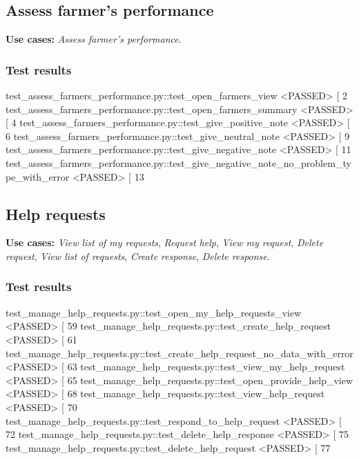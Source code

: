 \subsection{Assess farmer's performance}

\textbf{Use cases:} \textit{Assess farmer's performance}.

\subsubsection*{Test results}
\begin{verbnobox}[\scriptsize \vbdelim]
test_assess_farmers_performance.py::test_open_farmers_view <PASSED>                             [  2%
test_assess_farmers_performance.py::test_open_farmers_summary <PASSED>                          [  4%
test_assess_farmers_performance.py::test_give_positive_note <PASSED>                            [  6%
test_assess_farmers_performance.py::test_give_neutral_note <PASSED>                             [  9%
test_assess_farmers_performance.py::test_give_negative_note <PASSED>                            [ 11%
test_assess_farmers_performance.py::test_give_negative_note_no_problem_type_with_error <PASSED> [ 13%
\end{verbnobox}

\subsection{Help requests}

\textbf{Use cases:} \textit{View list of my requests}, \textit{Request help}, \textit{View my request}, \textit{Delete request}, \textit{View list of requests}, \textit{Create response}, \textit{Delete response}.

\subsubsection*{Test results}
\begin{verbnobox}[\footnotesize \vbdelim]
test_manage_help_requests.py::test_open_my_help_requests_view <PASSED>             [ 59%
test_manage_help_requests.py::test_create_help_request <PASSED>                    [ 61%
test_manage_help_requests.py::test_create_help_request_no_data_with_error <PASSED> [ 63%
test_manage_help_requests.py::test_view_my_help_request <PASSED>                   [ 65%
test_manage_help_requests.py::test_open_provide_help_view <PASSED>                 [ 68%
test_manage_help_requests.py::test_view_help_request <PASSED>                      [ 70%
test_manage_help_requests.py::test_respond_to_help_request <PASSED>                [ 72%
test_manage_help_requests.py::test_delete_help_response <PASSED>                   [ 75%
test_manage_help_requests.py::test_delete_help_request <PASSED>                    [ 77%
\end{verbnobox}

